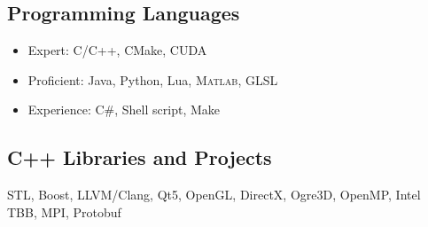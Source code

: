 \subsection{Programming Languages}
\begin{itemize}
\item Expert: C/C++, CMake, CUDA
\item Proficient: Java, Python, Lua, \textsc{Matlab}, GLSL
\item Experience: C\#, Shell script, Make
\end{itemize}

\subsection{C++ Libraries and Projects}
STL, Boost, LLVM/Clang, Qt5, OpenGL, DirectX, Ogre3D, OpenMP, Intel TBB, MPI, Protobuf

